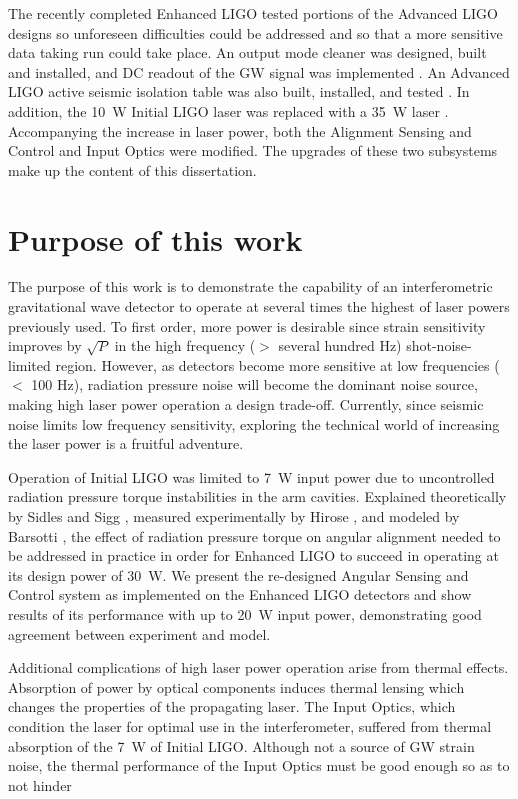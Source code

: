 The recently completed Enhanced LIGO tested portions of the Advanced
LIGO designs so unforeseen difficulties could be addressed and so that
a more sensitive data taking run could take place. An output mode
cleaner was designed, built and installed, and DC readout of the GW
signal was implemented \cite{Fricke2011DC}. An Advanced LIGO active
seismic isolation table was also built, installed, and tested
\cite{KisselThesis}. In addition, the 10~W Initial LIGO laser was
replaced with a 35~W laser \cite{Frede2007Fundamental}. Accompanying
the increase in laser power, both the Alignment Sensing and Control
and Input Optics were modified. The upgrades of these two subsystems
make up the content of this dissertation. 




\section{Purpose of this work}
The purpose of this work is to demonstrate the capability of an
interferometric gravitational wave detector to operate at several
times the highest of laser powers previously used. To first order,
more power is desirable since strain sensitivity improves by
$\sqrt{P}$ in the high frequency ($>$ several hundred Hz)
shot-noise-limited region. However, as detectors become more sensitive
at low frequencies ($<$ 100 Hz), radiation pressure noise will become
the dominant noise source, making high laser power operation a design
trade-off. Currently, since seismic noise limits low frequency
sensitivity, exploring the technical world of increasing the laser
power is a fruitful adventure.

Operation of Initial LIGO was limited to 7~W input power due to
uncontrolled radiation pressure torque instabilities in the arm
cavities. Explained theoretically by Sidles and Sigg
\cite{Sidles2006Optical}, measured experimentally by Hirose
\cite{Hirose2010Angular}, and modeled by Barsotti
\cite{Barsotti2009modeling}, the effect of radiation pressure torque
on angular alignment needed to be addressed in practice in order for
Enhanced LIGO to succeed in operating at its design power of 30~W. We
present the re-designed Angular Sensing and Control system as
implemented on the Enhanced LIGO detectors and show results of its
performance with up to 20~W input power, demonstrating good agreement
between experiment and model. 

Additional complications of high laser power operation arise from
thermal effects. Absorption of power by optical components induces
thermal lensing which changes the properties of the propagating
laser. The Input Optics, which condition the laser for optimal use in
the interferometer, suffered from thermal absorption of the 7~W of
Initial LIGO. Although not a source of GW strain noise, the thermal
performance of the Input Optics must be good enough so as to not
hinder 



